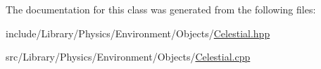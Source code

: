 The documentation for this class was generated from the following files\+:\begin{DoxyCompactItemize}
\item 
include/\+Library/\+Physics/\+Environment/\+Objects/\hyperlink{_celestial_8hpp}{Celestial.\+hpp}\item 
src/\+Library/\+Physics/\+Environment/\+Objects/\hyperlink{_celestial_8cpp}{Celestial.\+cpp}\end{DoxyCompactItemize}
